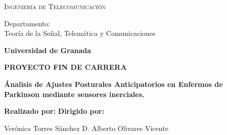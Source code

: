 \begin{titlepage}
\label{ch:portada}
\begin{center}

{\Large\textsc{Ingenier\'ia de Telecomunicaci\'on}}


Departamento:  \\ Teor\'ia de la Se\~nal, Telem\'atica y Comunicaciones

\textbf{Universidad de Granada}


\vspace{0.5cm}

\begin{figure}[h]
	\centering
	\label{fig:ugr}
\end{figure}


\vspace{0.5cm}
\textbf{PROYECTO FIN DE CARRERA}


\vspace{0.9cm}


{\Huge\textbf{\'Analisis de Ajustes Posturales Anticipatorios en Enfermos de Parkinson mediante sensores inerciales.}}


\end{center}


\vspace{1.5cm}
\textbf{Realizado por:}  \hfill \textbf{Dirigido por:}

Ver\'onica Torres S\'anchez \hfill D. Alberto Olivares Vicente



\end{titlepage}
